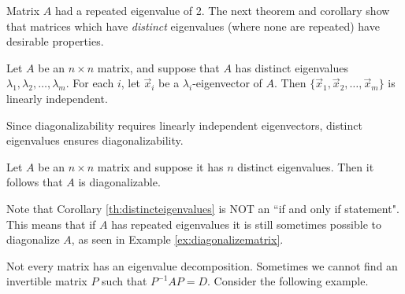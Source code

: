 \documentclass{ximera}
\begin{document}
  Matrix $A$ had a repeated eigenvalue of 2.  The next theorem and corollary show that matrices which have \emph{distinct} eigenvalues (where none are repeated) have desirable properties.
   
  \begin{theorem}\label{th:linindepeigenvectors}
  Let $A$ be an $n\times n$ matrix, and suppose that $A$
  has distinct eigenvalues $\lambda_1, \lambda_2, \ldots, \lambda_m$.
  For each $i$, let $\vec{x}_i$ be a $\lambda_i$-eigenvector of $A$.
  Then $\{ \vec{x}_1, \vec{x}_2, \ldots, \vec{x}_m\}$ is
  linearly independent.
  \end{theorem}
   
  Since diagonalizability requires linearly independent eigenvectors, distinct eigenvalues ensures diagonalizability.
   
  \begin{corollary}\label{th:distincteigenvalues}
  Let $A$ be an $n \times n$ matrix and suppose it has $n$ distinct eigenvalues. Then it follows that $A$ is diagonalizable.
  \end{corollary}
   
  \begin{remark}
      Note that Corollary \ref{th:distincteigenvalues} is NOT an ``if and only if statement".  This means that if $A$ has repeated eigenvalues it is still sometimes possible to diagonalize $A$, as seen in Example \ref{ex:diagonalizematrix}.
  \end{remark}
   
  Not every matrix has an eigenvalue decomposition. Sometimes we cannot find an invertible matrix $P$ such that $P^{-1}AP=D$.  Consider the following example.
   
\end{document}
